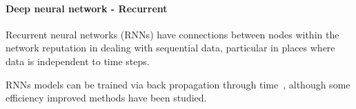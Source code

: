 \paragraph{Deep neural network - Recurrent}
Recurrent neural networks (RNNs) have connections between nodes within the network reputation in dealing with sequential data, particular in places where data is independent to time steps. 


RNNs models can be trained via back propagation through time~\cite{Goodfellow-et-al-2016}, although some efficiency improved methods have been studied.~\cite{963769,neco.1989,Gomez:2008:ANE:1390681.1390712}